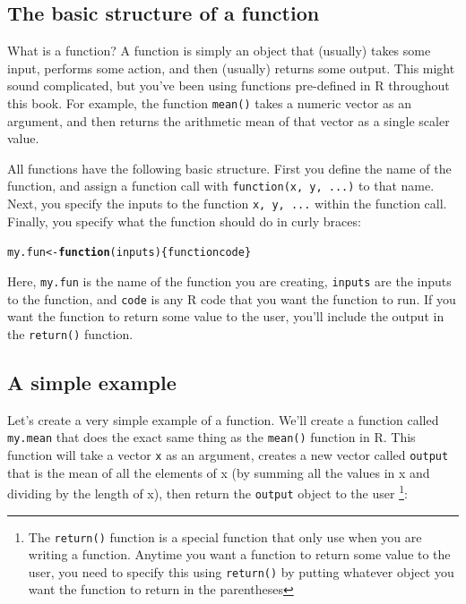 \documentclass{tufte-book}\usepackage[]{graphicx}\usepackage[]{color}
\makeatletter
\newcommand{\hlkwd}[1]{\textcolor[rgb]{0.737,0.353,0.396}{\textbf{#1}}}%
\newenvironment{kframe}{%
 \def\at@end@of@kframe{}%
 \ifinner\ifhmode%
  \def\at@end@of@kframe{\end{minipage}}%
  \begin{minipage}{\columnwidth}%
 \fi\fi%
 \def\FrameCommand##1{\hskip\@totalleftmargin \hskip-\fboxsep
 \colorbox{shadecolor}{##1}\hskip-\fboxsep
     \hskip-\linewidth \hskip-\@totalleftmargin \hskip\columnwidth}%
 \MakeFramed {\advance\hsize-\width
   \@totalleftmargin\z@ \linewidth\hsize
   \@setminipage}}%
 {\par\unskip\endMakeFramed%
 \at@end@of@kframe}
\newenvironment{knitrout}{}{} %
\makeatother
\begin{document}
\begin{footnotesize}
\section{The basic structure of a function}

What is a function? A function is simply an object that (usually) takes some input, performs some action, and then (usually) returns some output. This might sound complicated, but you've been using functions pre-defined in R throughout this book. For example, the function \texttt{mean()} takes a numeric vector as an argument, and then returns the arithmetic mean of that vector as a single scaler value.

All functions have the following basic structure. First you define the name of the function, and assign a function call with \texttt{function(x, y, ...)} to that name. Next, you specify the inputs to the function \texttt{x, y, ...} within the function call. Finally, you specify what the function should do in curly braces:

\begin{knitrout}
\color{fgcolor}\begin{kframe}
\begin{alltt}
my.fun <- \hlkwd{function}(inputs) \{function code\}
\end{alltt}
\end{kframe}
\end{knitrout}

Here, \texttt{my.fun} is the name of the function you are creating, \texttt{inputs} are the inputs to the function, and \texttt{code} is any R code that you want the function to run. If you want the function to return some value to the user, you'll include the output in the \texttt{return()} function.

\subsection{A simple example}

Let's create a very simple example of a function. We'll create a function called \texttt{my.mean} that does the exact same thing as the \texttt{mean()} function in R. This function will take a vector \texttt{x} as an argument, creates a new vector called \texttt{output} that is the mean of all the elements of x (by summing all the values in x and dividing by the length of x), then return the \texttt{output} object to the user \footnote{The \texttt{return()} function is a special function that only use when you are writing a function. Anytime you want a function to return some value to the user, you need to specify this using \texttt{return()} by putting whatever object you want the function to return in the parentheses}:


\end{footnotesize}
\end{document}
